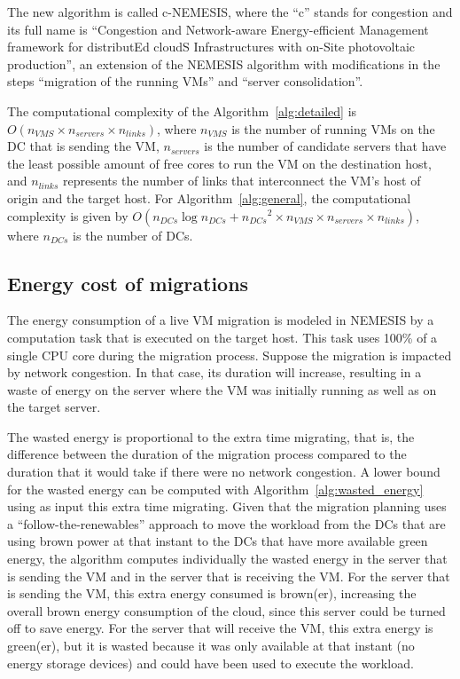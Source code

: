 The new algorithm is called c-NEMESIS, where the ``c'' stands for congestion and its full name is ``Congestion and Network-aware Energy-efficient Management framework for distributEd cloudS Infrastructures with on-Site photovoltaic production'', an extension of the NEMESIS algorithm with modifications in the steps ``migration of the running VMs'' and  ``server consolidation''.


The computational complexity of the Algorithm~\ref{alg:detailed} is $O(n_{VMS} \times  n_{servers} \times n_{links}  )$, where $n_{VMS}$ is the number of running VMs on the DC that is sending the VM, $n_{servers}$ is the number of candidate servers that have the least possible amount of free cores to run the VM on the destination host, and $n_{links}$ represents the number of links that interconnect the VM's host of origin and the target host. For Algorithm~\ref{alg:general}, the computational complexity is given by $O(n_{DCs}\log{}n_{DCs} + {n_{DCs}}^{2} \times n_{VMS} \times  n_{servers} \times n_{links})$, where $n_{DCs}$ is the number of DCs.

\subsection{Energy cost of migrations}\label{sec:energy_costs_mig}

The energy consumption of a live VM migration is modeled in NEMESIS by a computation task that is executed on the target host. This task uses 100\% of a single CPU core during the migration process. Suppose the migration is impacted by network congestion. In that case, its duration will increase, resulting in a waste of energy on the server where the VM was initially running as well as on the target server.


The wasted energy is proportional to the extra time migrating, that is, the difference between the duration of the migration process compared to the duration that it would take if there were no network congestion. A lower bound for the wasted energy can be computed with Algorithm~\ref{alg:wasted_energy} using as input this extra time migrating. Given that the migration planning uses a ``follow-the-renewables'' approach to move the workload from the DCs that are using brown power at that instant to the DCs that have more available green energy, the algorithm computes individually the wasted energy in the server that is sending the VM and in the server that is receiving the VM. For the server that is sending the VM, this extra energy consumed is brown(er), increasing the overall brown energy consumption of the cloud, since this server could be turned off to save energy. For the server that will receive the VM, this extra energy is green(er), but it is wasted because it was only available at that instant (no energy storage devices) and could have been used to execute the workload.

